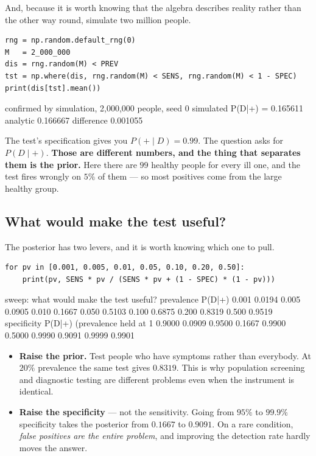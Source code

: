 \documentclass[11pt]{article}
\begin{document}
And, because it is worth knowing that the algebra describes reality rather
than the other way round, simulate two million people.

\begin{lstlisting}
rng = np.random.default_rng(0)
M   = 2_000_000
dis = rng.random(M) < PREV
tst = np.where(dis, rng.random(M) < SENS, rng.random(M) < 1 - SPEC)
print(dis[tst].mean())
\end{lstlisting}
\begin{codeout}
confirmed by simulation, 2,000,000 people, seed 0
   simulated P(D|+) = 0.165611   analytic 0.166667   difference 0.001055
\end{codeout}

\begin{caution}
The test's specification gives you $P(+ \mid D) = 0.99$. The question asks
for $P(D \mid +)$. \textbf{Those are different numbers, and the thing that
separates them is the prior.} Here there are $99$ healthy people for every
ill one, and the test fires wrongly on $5\%$ of them --- so most positives
come from the large healthy group.
\end{caution}

\subsection{What would make the test useful?}

The posterior has two levers, and it is worth knowing which one to pull.

\begin{lstlisting}
for pv in [0.001, 0.005, 0.01, 0.05, 0.10, 0.20, 0.50]:
    print(pv, SENS * pv / (SENS * pv + (1 - SPEC) * (1 - pv)))
\end{lstlisting}
\begin{codeout}
sweep: what would make the test useful?
   prevalence  P(D|+)
       0.001  0.0194
       0.005  0.0905
       0.010  0.1667
       0.050  0.5103
       0.100  0.6875
       0.200  0.8319
       0.500  0.9519
   specificity P(D|+)   (prevalence held at 1%
      0.9000  0.0909
      0.9500  0.1667
      0.9900  0.5000
      0.9990  0.9091
      0.9999  0.9901
\end{codeout}

\begin{itemize}[leftmargin=*]
  \item \textbf{Raise the prior.} Test people who have symptoms rather than
    everybody. At $20\%$ prevalence the same test gives $0.8319$. This is
    why population screening and diagnostic testing are different problems
    even when the instrument is identical.
  \item \textbf{Raise the specificity} --- not the sensitivity. Going from
    $95\%$ to $99.9\%$ specificity takes the posterior from $0.1667$ to
    $0.9091$. On a rare condition, \emph{false positives are the entire
    problem}, and improving the detection rate hardly moves the answer.
\end{itemize}
\end{document}
